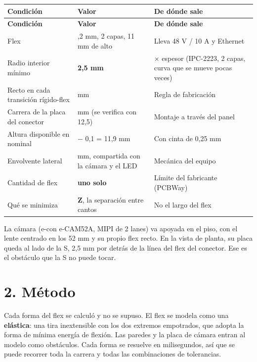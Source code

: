 \documentclass[11pt,a4paper]{article}
\begin{document}
\begingroup\footnotesize
\setlength{\tabcolsep}{4pt}
\setlength{\emergencystretch}{4em}
 
\begin{longtable}{@{}>{\RaggedRight\arraybackslash}p{}>{\RaggedRight\arraybackslash}p{}>{\RaggedRight\arraybackslash}p{}@{}}
\toprule
\scriptsize\textbf{Condición} & \scriptsize\textbf{Valor} & \scriptsize\textbf{De dónde sale} \\
\midrule
\endfirsthead
\toprule
\scriptsize\textbf{Condición} & \scriptsize\textbf{Valor} & \scriptsize\textbf{De dónde sale} \\
\midrule
\endhead
\bottomrule
\endfoot
Flex & 0,2 mm, 2 capas, 11 mm de alto & Lleva 48 V / 10 A y Ethernet \\
Radio interior mínimo & \textbf{2,5 mm} & 12 $\times$ espesor (IPC-2223, 2 capas, curva que se mueve pocas veces) \\
Recto en cada transición rígido-flex & 1 mm & Regla de fabricación \\
Carrera de la placa del conector & 12 mm (se verifica con 12,5) & Montaje a través del panel \\
Altura disponible en nominal & 12 $-$ 0,1 = 11,9 mm & Con cinta de 0,25 mm \\
Envolvente lateral & 52 mm, compartida con la cámara y el LED & Mecánica del equipo \\
Cantidad de flex & \textbf{uno solo} & Límite del fabricante (PCBWay) \\
Qué se minimiza & \textbf{Z}, la separación entre cantos & No el largo del flex \\
\end{longtable}
\endgroup

La cámara (e-con e-CAM52A, MIPI de 2 lanes) va apoyada en el piso, con el lente centrado en los 52 mm y su propio flex recto. En la vista de planta, su placa queda al lado de la S, 2,5 mm por detrás de la línea del flex del conector. Ese es el obstáculo que la S no puede tocar.

\clearpage

\section*{2. Método}

Cada forma del flex se calculó y no se supuso. El flex se modela como una \textbf{elástica}: una tira inextensible con los dos extremos empotrados, que adopta la forma de mínima energía de flexión. Las paredes y la placa de cámara entran al modelo como obstáculos. Cada forma se resuelve en milisegundos, así que se puede recorrer toda la carrera y todas las combinaciones de tolerancias.
\end{document}
